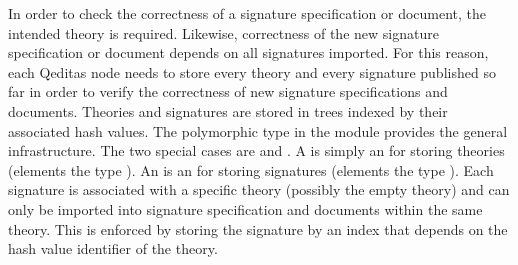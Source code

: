 In order to check the correctness of a signature specification
or document, the intended theory is required.
Likewise, correctness of the new signature specification
or document depends on all signatures imported.
For this reason, each Qeditas node needs to store every theory
and every signature published so far in order to verify the correctness of
new signature specifications and documents.
Theories and signatures are stored in trees indexed by their associated
hash values. The polymorphic type {} in the module {}
provides the general infrastructure.
The two special cases are
{}
and
{}.
A {} is simply an {} for storing theories (elements the type {}).
An {} is an {} for storing signatures (elements the type {}).
Each signature is associated with a specific theory (possibly the empty theory)
and can only be imported into signature specification and documents
within the same theory. This is enforced by storing the signature by an index that
depends on the hash value identifier of the theory.

